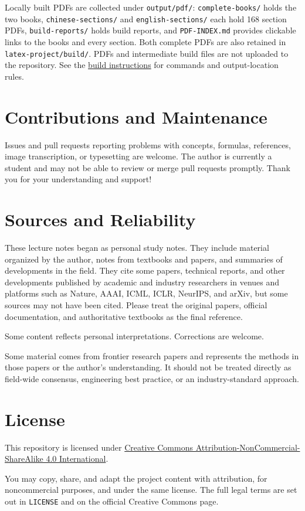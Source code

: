 Locally built PDFs are collected under \texttt{output/pdf/}: \texttt{complete-books/} holds the two books, \texttt{chinese-sections/} and \texttt{english-sections/} each hold 168 section PDFs, \texttt{build-reports/} holds build reports, and \texttt{PDF-INDEX.md} provides clickable links to the books and every section. Both complete PDFs are also retained in \texttt{latex-project/build/}. PDFs and intermediate build files are not uploaded to the repository. See the \href{latex-project/README_EN.md}{build instructions} for commands and output-location rules.

\hypertarget{contributions-and-maintenance}{%
\section{Contributions and Maintenance}\label{contributions-and-maintenance}}

Issues and pull requests reporting problems with concepts, formulas, references, image transcription, or typesetting are welcome. The author is currently a student and may not be able to review or merge pull requests promptly. Thank you for your understanding and support!

\hypertarget{sources-and-reliability}{%
\section{Sources and Reliability}\label{sources-and-reliability}}

These lecture notes began as personal study notes. They include material organized by the author, notes from textbooks and papers, and summaries of developments in the field. They cite some papers, technical reports, and other developments published by academic and industry researchers in venues and platforms such as Nature, AAAI, ICML, ICLR, NeurIPS, and arXiv, but some sources may not have been cited. Please treat the original papers, official documentation, and authoritative textbooks as the final reference.

Some content reflects personal interpretations. Corrections are welcome.

Some material comes from frontier research papers and represents the methods in those papers or the author's understanding. It should not be treated directly as field-wide consensus, engineering best practice, or an industry-standard approach.

\hypertarget{license}{%
\section{License}\label{license}}

This repository is licensed under \href{https://creativecommons.org/licenses/by-nc-sa/4.0/}{Creative Commons Attribution-NonCommercial-ShareAlike 4.0 International}.

You may copy, share, and adapt the project content with attribution, for noncommercial purposes, and under the same license. The full legal terms are set out in \texttt{LICENSE} and on the official Creative Commons page.

\clearpage
